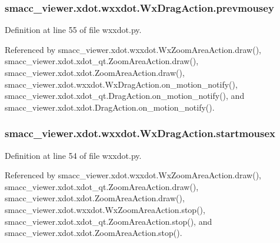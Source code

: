 \subsubsection[{\texorpdfstring{prevmousey}{prevmousey}}]{\setlength{\rightskip}{0pt plus 5cm}smacc\+\_\+viewer.\+xdot.\+wxxdot.\+Wx\+Drag\+Action.\+prevmousey}\hypertarget{classsmacc__viewer_1_1xdot_1_1wxxdot_1_1WxDragAction_a1db4a2150c484a26ecf7f55ba6f9fcaf}{}\label{classsmacc__viewer_1_1xdot_1_1wxxdot_1_1WxDragAction_a1db4a2150c484a26ecf7f55ba6f9fcaf}


Definition at line 55 of file wxxdot.\+py.



Referenced by smacc\+\_\+viewer.\+xdot.\+wxxdot.\+Wx\+Zoom\+Area\+Action.\+draw(), smacc\+\_\+viewer.\+xdot.\+xdot\+\_\+qt.\+Zoom\+Area\+Action.\+draw(), smacc\+\_\+viewer.\+xdot.\+xdot.\+Zoom\+Area\+Action.\+draw(), smacc\+\_\+viewer.\+xdot.\+wxxdot.\+Wx\+Drag\+Action.\+on\+\_\+motion\+\_\+notify(), smacc\+\_\+viewer.\+xdot.\+xdot\+\_\+qt.\+Drag\+Action.\+on\+\_\+motion\+\_\+notify(), and smacc\+\_\+viewer.\+xdot.\+xdot.\+Drag\+Action.\+on\+\_\+motion\+\_\+notify().

\subsubsection[{\texorpdfstring{startmousex}{startmousex}}]{\setlength{\rightskip}{0pt plus 5cm}smacc\+\_\+viewer.\+xdot.\+wxxdot.\+Wx\+Drag\+Action.\+startmousex}\hypertarget{classsmacc__viewer_1_1xdot_1_1wxxdot_1_1WxDragAction_a5cea936fca87c6c2a0729fa14bb3555f}{}\label{classsmacc__viewer_1_1xdot_1_1wxxdot_1_1WxDragAction_a5cea936fca87c6c2a0729fa14bb3555f}


Definition at line 54 of file wxxdot.\+py.



Referenced by smacc\+\_\+viewer.\+xdot.\+wxxdot.\+Wx\+Zoom\+Area\+Action.\+draw(), smacc\+\_\+viewer.\+xdot.\+xdot\+\_\+qt.\+Zoom\+Area\+Action.\+draw(), smacc\+\_\+viewer.\+xdot.\+xdot.\+Zoom\+Area\+Action.\+draw(), smacc\+\_\+viewer.\+xdot.\+wxxdot.\+Wx\+Zoom\+Area\+Action.\+stop(), smacc\+\_\+viewer.\+xdot.\+xdot\+\_\+qt.\+Zoom\+Area\+Action.\+stop(), and smacc\+\_\+viewer.\+xdot.\+xdot.\+Zoom\+Area\+Action.\+stop().

